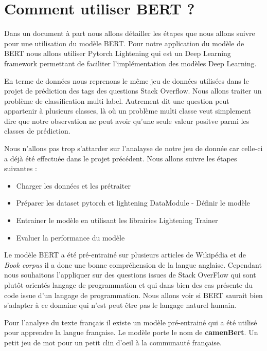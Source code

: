 \documentclass[8pt]{article}
\begin{document}
    \hypertarget{comment-utiliser-bert}{%
\section{Comment utiliser BERT ?}\label{comment-utiliser-bert}}

    Dans un document à part nous allons détailler les étapes que nous allons
suivre pour une utilisation du modèle BERT. Pour notre application du
modèle de BERT nous allons utiliser Pytorch Lightening qui est un Deep
Learning framework permettant de faciliter l'implémentation des modèles
Deep Learning.

En terme de données nous reprenons le même jeu de données utilisées dans
le projet de prédiction des tags des questions Stack Overflow. Nous
allons traiter un problème de classification multi label. Autrement dit
une question peut appartenir à plusieurs classes, là où un problème
multi classe veut simplement dire que notre observation ne peut avoir
qu'une seule valeur positve parmi les classes de prédiction.

    Nous n'allons pas trop s'attarder sur l'analayse de notre jeu de donnée
car celle-ci a déjà été effectuée dans le projet précédent. Nous allons
suivre les étapes suivantes : 

\begin{itemize}
\item Charger les données et les prétraiter 
\item Préparer les dataset pytorch et lightening DataModule - Définir le
modèle
\item Entrainer le modèle en utilisant les librairies Lightening Trainer 
\item  Evaluer la performance du modèle

\end{itemize}

    Le modèle BERT a été
pré-entrainé sur plusieurs articles de Wikipédia et de \emph{Book corpus} il a donc
une bonne compréhension de la langue anglaise. Cependant nous souhaitons
l'appliquer sur des questions issues de Stack OverFlow qui sont plutôt
orientés langage de programmation et qui dans bien des cas présente du
code issue d'un langage de programmation. Nous allons voir si BERT
saurait bien s'adapter à ce domaine qui n'est peut être pas le langage
naturel humain.

Pour l'analyse du texte français il existe un modèle pré-entrainé qui a
été utilisé pour apprendre la langue française. Le modèle porte le nom
de \textbf{camenBert}. Un petit jeu de mot pour un petit clin d'oeil à
la communauté française.
\end{document}
